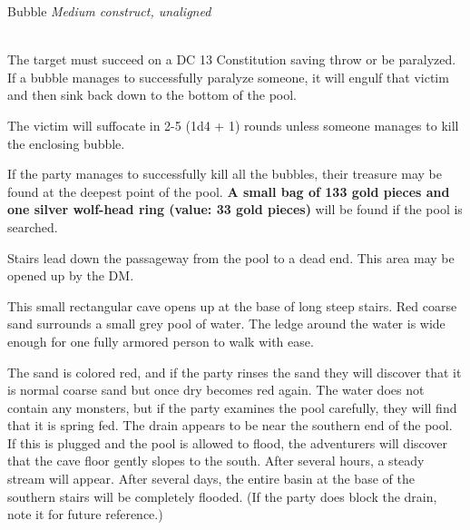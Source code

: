 \documentclass[palace_of_the_silver_princess]{subfiles}
\begin{document}
\begin{monsterbox}{Bubble}
    \textit{Medium construct, unaligned}\\
    \hline
    \basics[%
        armorclass = 9,
        hitpoints  = 2,
        speed      = 30 ft.
    ]
    \hline
    \stats[
        STR = \stat{1},
        DEX = \stat{5},
        CON = \stat{10},
        INT = \stat{1},
        WIS = \stat{1},
        CHA = \stat{1}
    ]
    \hline
    \details[
        languages = {---},
        challenge = {1/4},
    ]
    \hline
    \\[1mm]
     \begin{monsteraction}[Paralyze]
         The target must succeed on a DC 13 Constitution saving throw or
         be paralyzed.  If a bubble manages to successfully paralyze
         someone, it will engulf that victim and then sink back down to
         the bottom of the pool.

         The victim will suffocate in 2-5 (1d4 + 1) rounds unless someone
         manages to kill the enclosing bubble.
     \end{monsteraction}
\end{monsterbox}

If the party manages to successfully kill all the bubbles, their
treasure may be found at the deepest point of the pool. \textbf{A small
bag of 133 gold pieces and one silver wolf-head ring (value: 33 gold
pieces)} will be found if the pool is searched.

Stairs lead down the passageway from the pool to a dead end. This area
may be opened up by the DM.

\begin{quotebox}
    This small rectangular cave opens up at the base of long steep
    stairs. Red coarse sand surrounds a small grey pool of water. The
    ledge around the water is wide enough for one fully armored person
    to walk with ease.
\end{quotebox}

The sand is colored red, and if the party rinses the sand they will
discover that it is normal coarse sand but once dry becomes red again.
The water does not contain any monsters, but if the party examines the
pool carefully, they will find that it is spring fed. The drain appears
to be near the southern end of the pool. If this is plugged and the pool
is allowed to flood, the adventurers will discover that the cave floor
gently slopes to the south. After several hours, a steady stream will
appear. After several days, the entire basin at the base of the southern
stairs will be completely flooded. (If the party does block the drain,
note it for future reference.)
\end{document}
